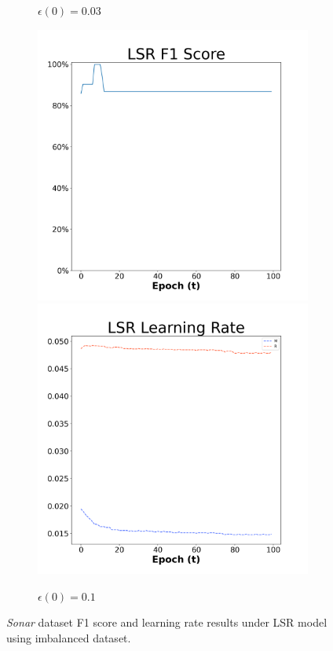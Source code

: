 \begin{figure}[H]
\begin{subfigure}{0.3\textwidth}
  \caption{$\epsilon(0)=0.03$}
\end{subfigure}\hfil %
\begin{subfigure}{0.3\textwidth}
  \includegraphics[width=\linewidth]{images/exper2/Sonar/LSR_0.1_f1.png}
  \includegraphics[width=\linewidth]{images/exper2/Sonar/LSR_0.1_lr.png}
  \caption{$\epsilon(0)=0.1$}
\end{subfigure}

\caption{\textit{Sonar} dataset F1 score and learning rate results under LSR model using imbalanced dataset.}
\end{figure}

